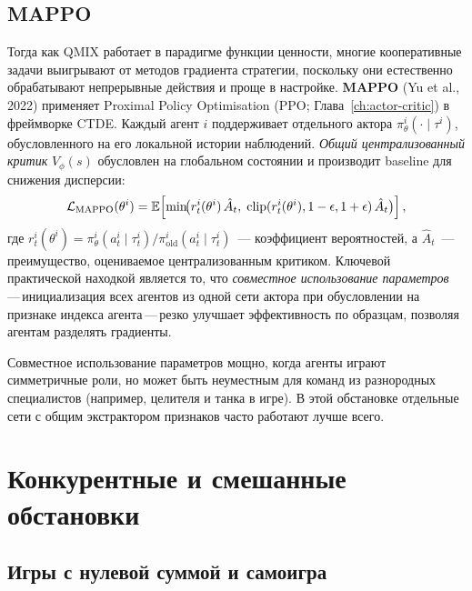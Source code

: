 \subsection{MAPPO}

Тогда как QMIX работает в парадигме функции ценности, многие кооперативные
задачи выигрывают от методов градиента стратегии, поскольку они естественно обрабатывают
непрерывные действия и проще в настройке. \textbf{MAPPO}
 (Yu et al., 2022) применяет Proximal Policy
Optimisation (PPO; Глава~\ref{ch:actor-critic}) в фреймворке CTDE.
Каждый агент $i$ поддерживает отдельного актора $\pi^i_\theta(\cdot \mid
\tau^i)$, обусловленного на его локальной истории наблюдений. \emph{Общий
централизованный критик} $V_\phi(s)$ обусловлен на глобальном состоянии и
производит baseline для снижения дисперсии:
\begin{equation}
\label{eq:mappo-objective}
\mathcal{L}_\mathrm{MAPPO}(\theta^i) =
\operatorname{\mathbb{E}}\!\left[\min\!\bigl(r^i_t(\theta^i)\,\hat{A}_t,\;
  \mathrm{clip}(r^i_t(\theta^i), 1-\epsilon, 1+\epsilon)\,\hat{A}_t
\bigr)\right],
\end{equation}
где $r^i_t(\theta^i) = \pi^i_\theta(a^i_t \mid \tau^i_t) /
\pi^i_{\mathrm{old}}(a^i_t \mid \tau^i_t)$~--- коэффициент вероятностей,
а $\hat{A}_t$~--- преимущество, оцениваемое централизованным критиком.
Ключевой практической находкой является то, что \emph{совместное использование параметров}\,---\,инициализация всех агентов из одной сети актора
при обусловлении на признаке индекса агента\,---\,резко
улучшает эффективность по образцам, позволяя агентам разделять градиенты.

\begin{remark}
Совместное использование параметров мощно, когда агенты играют симметричные роли, но
может быть неуместным для команд из разнородных специалистов (например,
целителя и танка в игре). В этой обстановке отдельные сети с
общим экстрактором признаков часто работают лучше всего.
\end{remark}

\section{Конкурентные и смешанные обстановки}
\label{sec:competitive}

\subsection{Игры с нулевой суммой и самоигра}

